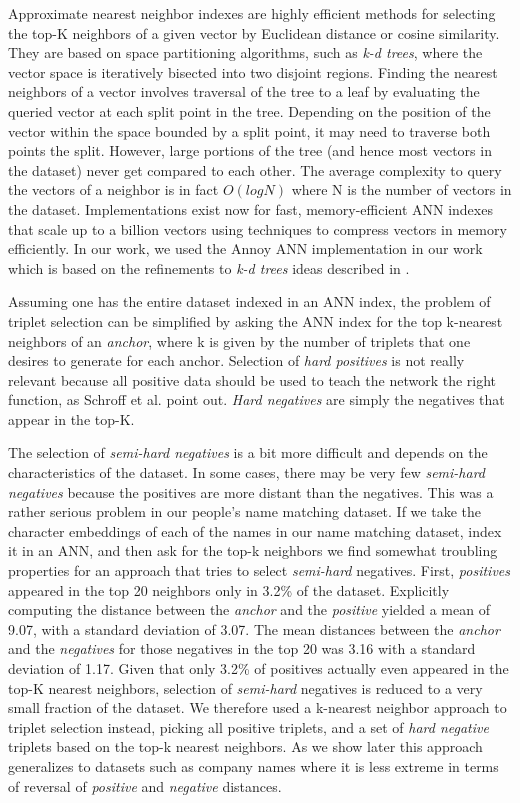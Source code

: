 Approximate nearest neighbor indexes are highly efficient methods for selecting the top-K neighbors of a given vector by Euclidean distance or cosine similarity.  They are based on space partitioning algorithms, such as \textit{k-d trees}, where the vector space is iteratively bisected into two disjoint regions.  Finding the nearest neighbors of a vector involves traversal of the tree to a leaf by evaluating the queried vector at each split point in the tree.  Depending on the position of the vector within the space bounded by a split point, it may need to traverse both points the split.  However, large portions of the tree (and hence most vectors in the dataset) never get compared to each other.  The average complexity to query the vectors of a neighbor is in fact $O(log N)$ where N is the number of vectors in the dataset.  Implementations exist now for fast, memory-efficient ANN indexes that scale up to a billion vectors \cite{JDH17} using techniques to compress vectors in memory efficiently.  In our work, we used the Annoy ANN implementation \cite{annoy_git} in our work which is based on the refinements to \textit{k-d trees} ideas described in \cite{annoy-paper}.

Assuming one has the entire dataset indexed in an ANN index, the problem of triplet selection can be simplified by asking the ANN index for the top k-nearest neighbors of an \textit{anchor}, where k is given by the number of triplets that one desires to generate for each anchor.  Selection of \textit{hard positives} is not really relevant because all positive data should be used to teach the network the right function, as Schroff et al. point out.  \textit{Hard negatives} are simply the negatives that appear in the top-K.  

The selection of \textit{semi-hard negatives} is a bit more difficult and depends on the characteristics of the dataset.  In some cases, there may be very few \textit{semi-hard negatives} because the positives are more distant than the negatives.  This was a rather serious problem in our people's name matching dataset.  If we take the character embeddings of each of the names in our name matching dataset, index it in an ANN, and then ask for the top-k neighbors we find somewhat troubling properties for an approach that tries to select \textit{semi-hard} negatives.  First, \textit{positives} appeared in the top 20 neighbors only in 3.2\% of the dataset.  Explicitly computing the distance between the \textit{anchor} and the \textit{positive} yielded a mean of 9.07, with a standard deviation of 3.07.  The mean distances between the \textit{anchor} and the \textit{negatives} for those negatives in the top 20 was 3.16 with a standard deviation of 1.17.  Given that only 3.2\% of positives actually even appeared in the top-K nearest neighbors, selection of \textit{semi-hard} negatives is reduced to a very small fraction of the dataset.  We therefore used a k-nearest neighbor approach to triplet selection instead, picking all positive triplets, and a set of \textit{hard negative} triplets based on the top-k nearest neighbors.  As we show later this approach generalizes to datasets such as company names where it is less extreme in terms of reversal of \textit{positive} and \textit{negative} distances.
